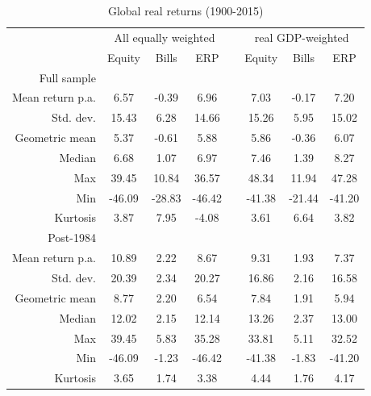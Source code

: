 {\renewcommand{\arraystretch}{1}
\begin{table}[H]
\begin{center}
\begin{tabular}{rccccccc}
\hline
\hline
 & \multicolumn{3}{c}{All equally weighted} & & \multicolumn{3}{c}{real GDP-weighted} \\
 \cline{2-4} \cline{6-8}
 & Equity & Bills & ERP & &Equity & Bills & ERP \\
\hline
Full sample & & & & & & & \\
\hline

Mean return p.a. & 6.57 & -0.39 & 6.96 & & 7.03 & -0.17 & 7.20\\ 

Std. dev. & 15.43 & 6.28 & 14.66 & & 15.26 & 5.95 & 15.02\\ 

Geometric mean & 5.37 & -0.61 & 5.88 & & 5.86 & -0.36 & 6.07\\ 

Median & 6.68 & 1.07 & 6.97 & & 7.46 & 1.39 & 8.27\\ 

Max & 39.45 & 10.84 & 36.57 & & 48.34 & 11.94 & 47.28\\ 

Min & -46.09 & -28.83 & -46.42 & & -41.38 & -21.44 & -41.20\\ 

Kurtosis & 3.87 & 7.95 & -4.08 & & 3.61 & 6.64 & 3.82\\ 

\hline 
Post-1984 & & & & & & & \\
\hline 

Mean return p.a. & 10.89 & 2.22 & 8.67 & & 9.31 & 1.93 & 7.37\\ 

Std. dev. & 20.39 & 2.34 & 20.27 & & 16.86 & 2.16 & 16.58\\ 

Geometric mean & 8.77 & 2.20 & 6.54 & & 7.84 & 1.91 & 5.94\\ 

Median & 12.02 & 2.15 & 12.14 & & 13.26 & 2.37 & 13.00\\ 

Max & 39.45 & 5.83 & 35.28 & & 33.81 & 5.11 & 32.52\\ 

Min & -46.09 & -1.23 & -46.42 & & -41.38 & -1.83 & -41.20\\ 

Kurtosis & 3.65 & 1.74 & 3.38 & & 4.44 & 1.76 & 4.17\\ 
\hline
\hline
\end{tabular} 
\end{center}
\caption{Global real returns (1900-2015)}
\label{tab:global_returns}
\end{table}

}
